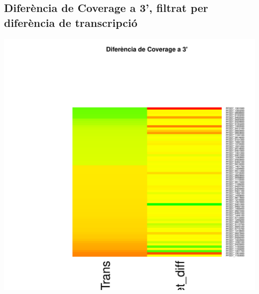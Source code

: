 \documentclass{article}\usepackage[]{graphicx}\usepackage[]{color}
\newenvironment{knitrout}{}{} %
\begin{document}
\subsection{Diferència de Coverage a 3', filtrat per diferència de transcripció}
\begin{knitrout}
\color{fgcolor}

{\centering \includegraphics[width=.9\linewidth]{figure/minimal-_heat_cov_diff_3-1} 

}



\end{knitrout}
\clearpage
\end{document}
